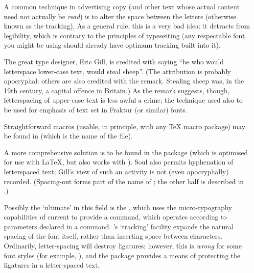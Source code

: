 A common technique in advertising copy (and other text whose actual
content need not actually be \emph{read}) is to alter the space
between the letters (otherwise known as the tracking).  As a general
rule, this is a very bad idea: it detracts from legibility, which is
contrary to the principles of typesetting (any respectable font you
might be using should already have optimum tracking built into it).

The great type designer, Eric Gill, is credited with saying ``he who
would letterspace lower-case text, would steal sheep''.  (The
attribution is probably apocryphal: others are also credited with the
remark.  Stealing sheep was, in the 19th century, a capital offence in
Britain.)  As the remark suggests, though, letterspacing of upper-case
text is less awful a crime; the technique used also to be used for
emphasis of text set in Fraktur (or similar) fonts.

Straightforward macros (usable, in principle, with any \TeX{} macro
package) may be found in  (which is the name of
the  file).


A more comprehensive solution is to be found in the 
package (which is optimised for use with \LaTeX{}, but also works with
\plaintex{}).  Soul also permits hyphenation of letterspaced text;
Gill's view of such an activity is not (even apocryphally) recorded.
(Spacing-out forms part of the name of ; the other half
is described in .)

Possibly the `ultimate' in this field is the ,
which uses the micro-typography capabilities of current \PDFTeX{} to
provide a  command, which operates according to parameters
declared in a  command.  's
`tracking' facility expands the natural spacing of the font itself,
rather than inserting space between characters.  Ordinarily,
letter-spacing will destroy ligatures; however, this is \emph{wrong}
for some font styles (for example, ), and the
package provides a means of protecting the ligatures in a
letter-spaced text.
\begin{ctanrefs}
\item[letterspacing.tex]
\item[microtype.sty]
\item[soul.sty]
\end{ctanrefs}

